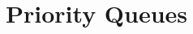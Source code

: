 
\chapter {Priority Queues} \label{Priority Queues and Related Types}


\newpage

\newpage

\newpage

\newpage

